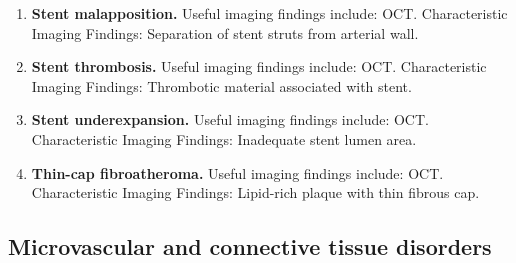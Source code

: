 \begin{enumerate}[leftmargin=*,itemsep=0.45em,topsep=0.4em]
\item \textbf{Stent malapposition.} Useful imaging findings include: OCT. Characteristic Imaging Findings: Separation of stent struts from arterial wall.
\item \textbf{Stent thrombosis.} Useful imaging findings include: OCT. Characteristic Imaging Findings: Thrombotic material associated with stent.
\item \textbf{Stent underexpansion.} Useful imaging findings include: OCT. Characteristic Imaging Findings: Inadequate stent lumen area.
\item \textbf{Thin-cap fibroatheroma.} Useful imaging findings include: OCT. Characteristic Imaging Findings: Lipid-rich plaque with thin fibrous cap.
\end{enumerate}

\subsection{Microvascular and connective tissue disorders}
